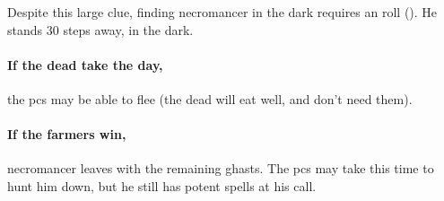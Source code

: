 Despite this large clue, finding \gls{necromancer} in the dark requires an  roll (\tn[12]).
He stands 30 \glspl{step} away, in the dark.

\paragraph{If the dead take the day,}
the \glspl{pc} may be able to flee (the dead will eat well, and don't need them).

\paragraph{If the farmers win,}
\gls{necromancer} leaves with the remaining ghasts.
The \glspl{pc} may take this time to hunt him down, but he still has potent spells at his call.

\thenecromancer

\showStdSpells[
  \deathStormSpell
]




